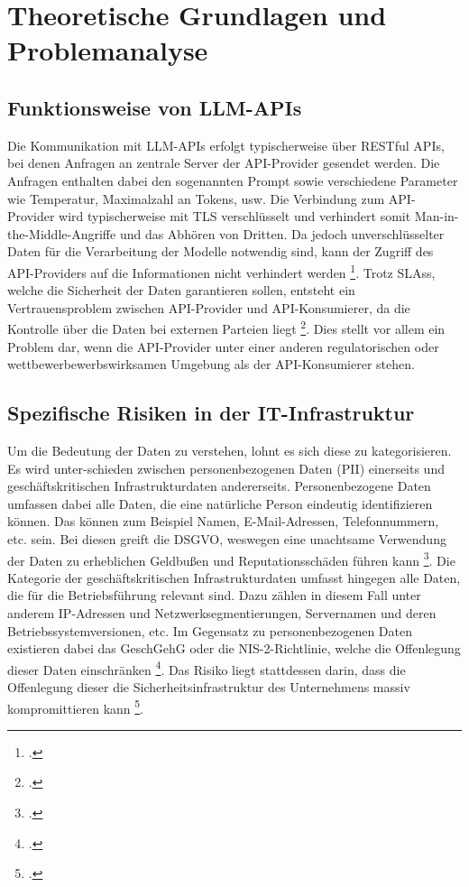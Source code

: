 \chapter{Theoretische Grundlagen und Problemanalyse}

\section{Funktionsweise von \ac{LLM}-\acp{API}}

Die Kommunikation mit \ac{LLM}-\acp{API} erfolgt typischerweise über \ac{REST}ful \acp{API}, bei denen Anfragen
an zentrale Server der \ac{API}-Provider gesendet werden.
Die Anfragen enthalten dabei den sogenannten Prompt sowie verschiedene Parameter wie Temperatur, Maximalzahl an Tokens, usw.
Die Verbindung zum \ac{API}-Provider wird typischerweise mit \ac{TLS} verschlüsselt und verhindert somit
Man-in-the-Middle-Angriffe und das Abhören von Dritten.
Da jedoch unverschlüsselter Daten für die Verarbeitung der Modelle notwendig sind,
kann der Zugriff des \ac{API}-Providers auf die Informationen nicht verhindert werden \footcite{staab2025sokprivacyparadox}.
Trotz \acp{SLA}s, welche die Sicherheit der Daten garantieren sollen,
entsteht ein Vertrauensproblem zwischen \ac{API}-Provider und \ac{API}-Konsumierer,
da die Kontrolle über die Daten bei externen Parteien liegt \footcite{tantoush2025digitalsovereignty}. Dies stellt vor allem ein Problem dar,
wenn die \ac{API}-Provider unter einer anderen regulatorischen oder wettbewerbewerbswirksamen Umgebung als der \ac{API}-Konsumierer stehen.


\section{Spezifische Risiken in der \ac{IT}-Infrastruktur}
Um die Bedeutung der Daten zu verstehen, lohnt es sich diese zu kategorisieren.
Es wird unter-schieden zwischen personenbezogenen Daten (\ac{PII}) einerseits und
geschäftskritischen Infrastrukturdaten andererseits. Personenbezogene Daten umfassen dabei alle Daten, die eine natürliche Person eindeutig identifizieren können.
Das können zum Beispiel Namen, E-Mail-Adressen, Telefonnummern, etc. sein. Bei diesen greift die \ac{DSGVO},
weswegen eine unachtsame Verwendung der Daten zu erheblichen Geldbußen und Reputationsschäden führen kann \footcite{chen2024understandingpiileakage}.
Die Kategorie der geschäftskritischen Infrastrukturdaten umfasst hingegen alle Daten, die für die Betriebsführung relevant sind.
Dazu zählen in diesem Fall unter anderem IP-Adressen und Netzwerksegmentierungen, Servernamen und deren Betriebssystemversionen, etc.
Im Gegensatz zu personenbezogenen Daten existieren dabei das \ac{GeschGehG}
oder die \ac{NIS-2}-Richtlinie, welche die Offenlegung dieser Daten einschränken \footcite{europeanparliament2025interplayaact}.
Das Risiko liegt stattdessen darin, dass die Offenlegung dieser die Sicherheitsinfrastruktur des Unternehmens massiv
kompromittieren kann \footcite{deng2024securitysurveyllm}.